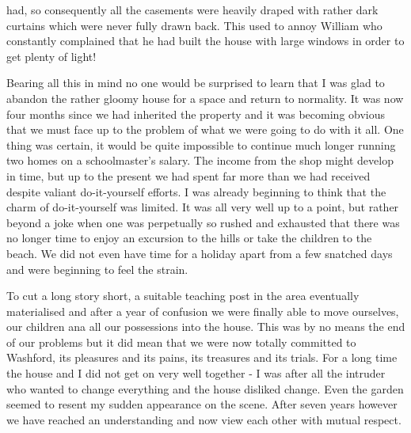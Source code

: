 had, so consequently all the casements were heavily draped with rather dark curtains which were never fully drawn back. This used to annoy William who constantly complained that he had built the house with large windows in order to get plenty of light!

Bearing all this in mind no one would be surprised to learn that I was glad to abandon the rather gloomy house for a space and return to normality. It was now four months since we had inherited the property and it was becoming obvious that we must face up to the problem of what we were going to do with it all. One thing was certain, it would be quite impossible to continue much longer running two homes on a schoolmaster's salary. The income from the shop might develop in time, but up to the present we had spent far more than we had received despite valiant do-it-yourself efforts. I was already beginning to think that the charm of do-it-yourself was limited. It was all very well up to a point, but rather beyond a joke when one was perpetually so rushed and exhausted that there was no longer time to enjoy an excursion to the hills or take the children to the beach. We did not even have time for a holiday apart from a few snatched days and were beginning to feel the strain.

To cut a long story short, a suitable teaching post in the area eventually materialised and after a year of confusion we were finally able to move ourselves, our children ana all our possessions into the house. This was by no means the end of our problems but it did mean that we were now totally committed to Washford, its pleasures and its pains, its treasures and its trials. For a long time the house and I did not get on very well together - I was after all the intruder who wanted to change everything and the house disliked change. Even the garden seemed to resent my sudden appearance on the scene. After seven years however we have reached an understanding and now view each other with mutual respect.